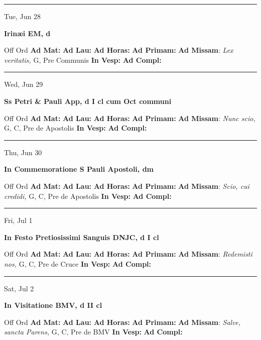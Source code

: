 \documentclass[letterpaper, 10pt]{article}
\begin{document}
\hrule
\begin{center}
Tue, Jun 28
\end{center}\textbf{ \large Irinæi EM, \textnormal{\normalsize d}}
\begin{justify}
Off Ord
\textbf{Ad Mat: }
\textbf{Ad Lau: }
\textbf{Ad Horas: }
\textbf{Ad Primam: }
\textbf{Ad Missam}: \textit{Lex veritatis,} G, Pre Communis
\textbf{In Vesp: }
\textbf{Ad Compl: }\end{justify}



\hrule
\begin{center}
Wed, Jun 29
\end{center}\textbf{ \large Ss Petri \& Pauli App, \textnormal{\normalsize d I cl cum Oct communi}}
\begin{justify}
Off Ord
\textbf{Ad Mat: }
\textbf{Ad Lau: }
\textbf{Ad Horas: }
\textbf{Ad Primam: }
\textbf{Ad Missam}: \textit{Nunc scio,} G, C, Pre de Apostolis
\textbf{In Vesp: }
\textbf{Ad Compl: }\end{justify}



\hrule
\begin{center}
Thu, Jun 30
\end{center}\textbf{ \large In Commemoratione S Pauli Apostoli, \textnormal{\normalsize dm}}
\begin{justify}
Off Ord
\textbf{Ad Mat: }
\textbf{Ad Lau: }
\textbf{Ad Horas: }
\textbf{Ad Primam: }
\textbf{Ad Missam}: \textit{Scio, cui credidi,} G, C, Pre de Apostolis
\textbf{In Vesp: }
\textbf{Ad Compl: }\end{justify}



\hrule
\begin{center}
Fri, Jul 1
\end{center}\textbf{ \large In Festo Pretiosissimi Sanguis DNJC, \textnormal{\normalsize d I cl}}
\begin{justify}
Off Ord
\textbf{Ad Mat: }
\textbf{Ad Lau: }
\textbf{Ad Horas: }
\textbf{Ad Primam: }
\textbf{Ad Missam}: \textit{Redemisti nos,} G, C, Pre de Cruce
\textbf{In Vesp: }
\textbf{Ad Compl: }\end{justify}



\hrule
\begin{center}
Sat, Jul 2
\end{center}\textbf{ \large In Visitatione BMV, \textnormal{\normalsize d II cl}}
\begin{justify}
Off Ord
\textbf{Ad Mat: }
\textbf{Ad Lau: }
\textbf{Ad Horas: }
\textbf{Ad Primam: }
\textbf{Ad Missam}: \textit{Salve, sancta Parens,} G, C, Pre de BMV
\textbf{In Vesp: }
\textbf{Ad Compl: }\end{justify}
\end{document}
